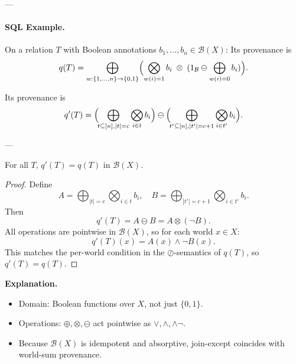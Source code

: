 ---

\paragraph{SQL Example.}  
On a relation \(T\) with Boolean annotations \(b_1,\dots,b_n\in\mathcal{B}(X)\):
Its provenance is
\[
q(T)=\bigoplus_{w:\{1,\dots,n\}\to\{0,1\}}
\Bigl(
\bigotimes_{w(i)=1}b_i
\;\otimes\;
(1_{\mathcal{B}}\ominus\bigoplus_{w(i)=0}b_i)
\Bigr).
\]

Its provenance is
\[
q'(T)=\Bigl(\!\bigoplus_{t\subseteq[n],|t|=c}\bigotimes_{i\in t}b_i\Bigr)
\ominus
\Bigl(\!\bigoplus_{t'\subseteq[n],|t'|=c+1}\bigotimes_{i\in t'}b_i\Bigr).
\]

---

\begin{proposition}
For all \(T\), \(q'(T)=q(T)\) in \(\mathcal{B}(X)\).
\end{proposition}

\begin{proof}
Define
\[
A=\bigoplus_{|t|=c}\bigotimes_{i\in t}b_i, \quad
B=\bigoplus_{|t'|=c+1}\bigotimes_{i\in t'}b_i.
\]
Then
\[
q'(T)=A\ominus B=A\otimes(\neg B).
\]
All operations are pointwise in \(\mathcal{B}(X)\), so for each world \(x\in X\):
\[
q'(T)(x)=A(x)\wedge\neg B(x).
\]
This matches the per-world condition in the $\oslash$-semantics of $q(T)$, so $q'(T)=q(T)$.
\end{proof}

\noindent\textbf{Explanation.}
\begin{itemize}
  \item Domain: Boolean functions over $X$, not just $\{0,1\}$.  
  \item Operations: $\oplus,\otimes,\ominus$ act pointwise as $\vee,\wedge,\wedge\neg$.  
  \item Because $\mathcal{B}(X)$ is idempotent and absorptive, join-except coincides with world-sum provenance.
\end{itemize}              


